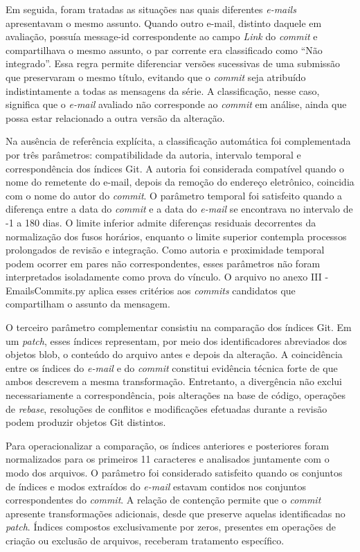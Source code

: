 Em seguida, foram tratadas as situações nas quais diferentes \textit{e-mails} apresentavam o mesmo assunto. Quando outro e-mail, distinto daquele em avaliação, possuía message-id correspondente ao campo \textit{Link} do \textit{commit} e compartilhava o mesmo assunto, o par corrente era classificado como ``Não integrado''. Essa regra permite diferenciar versões sucessivas de uma submissão que preservaram o mesmo título, evitando que o \textit{commit} seja atribuído indistintamente a todas as mensagens da série. A classificação, nesse caso, significa que o \textit{e-mail} avaliado não corresponde ao \textit{commit} em análise, ainda que possa estar relacionado a outra versão da alteração.

Na ausência de referência explícita, a classificação automática foi complementada por três parâmetros: compatibilidade da autoria, intervalo temporal e correspondência dos índices Git. A autoria foi considerada compatível quando o nome do remetente do e-mail, depois da remoção do endereço eletrônico, coincidia com o nome do autor do \textit{commit}. O parâmetro temporal foi satisfeito quando a diferença entre a data do \textit{commit} e a data do \textit{e-mail} se encontrava no intervalo de -1 a 180 dias. O limite inferior admite diferenças residuais decorrentes da normalização dos fusos horários, enquanto o limite superior contempla processos prolongados de revisão e integração. Como autoria e proximidade temporal podem ocorrer em pares não correspondentes, esses parâmetros não foram interpretados isoladamente como prova do vínculo. O arquivo no anexo III - EmailsCommits.py aplica esses critérios aos \textit{commits} candidatos que compartilham o assunto da mensagem.

O terceiro parâmetro complementar consistiu na comparação dos índices Git. Em um \textit{patch}, esses índices representam, por meio dos identificadores abreviados dos objetos blob, o conteúdo do arquivo antes e depois da alteração. A coincidência entre os índices do \textit{e-mail} e do \textit{commit} constitui evidência técnica forte de que ambos descrevem a mesma transformação. Entretanto, a divergência não exclui necessariamente a correspondência, pois alterações na base de código, operações de \textit{rebase}, resoluções de conflitos e modificações efetuadas durante a revisão podem produzir objetos Git distintos.

Para operacionalizar a comparação, os índices anteriores e posteriores foram normalizados para os primeiros 11 caracteres e analisados juntamente com o modo dos arquivos. O parâmetro foi considerado satisfeito quando os conjuntos de índices e modos extraídos do \textit{e-mail} estavam contidos nos conjuntos correspondentes do \textit{commit}. A relação de contenção permite que o \textit{commit} apresente transformações adicionais, desde que preserve aquelas identificadas no \textit{patch}. Índices compostos exclusivamente por zeros, presentes em operações de criação ou exclusão de arquivos, receberam tratamento específico.

